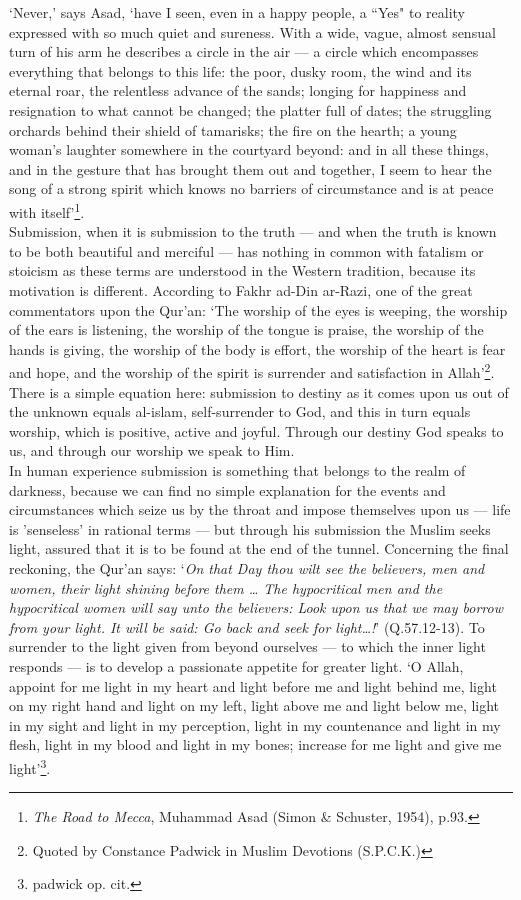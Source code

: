 \documentclass[10pt, twoside,openright]{book}
\begin{document}
`Never,' says Asad, `have I seen, even in a happy people, a ``Yes" to reality expressed with so much 
quiet and sureness. With a wide, vague, almost sensual turn of his arm he describes a circle in the 
air --- a circle which encompasses everything that belongs to this life: the poor, dusky room, the wind 
and its eternal roar, the relentless advance of the sands; longing for happiness and resignation to 
what cannot be changed; the platter full of dates; the struggling orchards behind their shield of 
tamarisks; the fire on the hearth; a young woman's laughter somewhere in the courtyard beyond: and in 
all these things, and in the gesture that has brought them out and together, I seem to hear the song 
of a strong spirit which knows no barriers of circumstance and is at peace with itself'\footnote{\emph{The Road to Mecca}, Muhammad Asad (Simon \& Schuster, 1954), p.93.}. \\

Submission, when it is submission to the truth --- and when the truth is known to be both beautiful and 
merciful --- has nothing in common with fatalism or stoicism as these terms are understood in the 
Western tradition, because its motivation is different. According to Fakhr ad\hyp{}Din ar\hyp{}Razi, one of the great commentators upon the Qur'an: `The worship of the eyes is weeping, the worship of the ears is 
listening, the worship of the tongue is praise, the worship of the hands is giving, the worship of 
the body is effort, the worship of the heart is fear and hope, and the worship of the spirit is 
surrender and satisfaction in Allah'\footnote{Quoted by Constance Padwick in Muslim Devotions (S.P.C.K.)}. There is a simple equation here: submission to destiny as it comes upon us out of the unknown equals al\hyp{}islam, self\hyp{}surrender to God, and this in turn equals worship, which is positive, active and joyful. Through our destiny God speaks to us, and through our worship we speak to Him. \\

In human experience submission is something that belongs to the realm of darkness, because we can 
find no simple explanation for the events and circumstances which seize us by the throat and impose 
themselves upon us --- life is 'senseless' in rational terms --- but through his submission the Muslim 
seeks light, assured that it is to be found at the end of the tunnel. Concerning the final reckoning, 
the Qur'an says: `\emph{On that Day thou wilt see the believers, men and women, their light shining before them \ldots{} The hypocritical men and the hypocritical women will say unto the believers: Look upon us that we may borrow from your light. It will be said: Go back and seek for light\ldots{}!}' (Q.57.12-13). To surrender to the light given from beyond ourselves --- to which the inner light responds --- is to develop a passionate appetite for greater light. `O Allah, appoint for me light in my heart and light before me and light behind me, light on my right hand and light on my left, light above me and light below me, light in my sight and light in my perception, light in my countenance and light in my flesh, light in my blood and light in my bones; increase for me light and give me light'\footnote{padwick op. cit.}.\\
\end{document}
